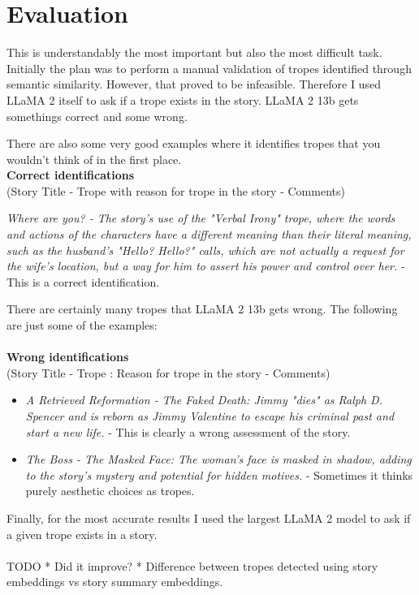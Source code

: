 \documentclass[11pt]{article}
\begin{document}
\section{Evaluation}
This is understandably the most important but also the most difficult task. Initially the plan was to perform a manual validation of tropes identified through semantic similarity. However, that proved to be infeasible. Therefore I used LLaMA 2 itself to ask if a trope exists in the story. LLaMA 2 13b gets somethings correct and some wrong.

There are also some very good examples where it identifies tropes that you wouldn't think of in the first place.\\
\textbf{Correct identifications}\\
(Story Title - Trope with reason for trope in the story - Comments)

\textit{Where are you? - The story's use of the "Verbal Irony" trope, where the words and actions of the characters have a different meaning than their literal meaning, such as the husband's "Hello? Hello?" calls, which are not actually a request for the wife's location, but a way for him to assert his power and control over her.} - This is a correct identification.

There are certainly many tropes that LLaMA 2 13b gets wrong. The following are just some of the examples:
\\
\\
\textbf{Wrong identifications}\\
(Story Title - Trope : Reason for trope in the story - Comments)\\
\begin{itemize}
  \item \textit{A Retrieved Reformation - The Faked Death: Jimmy "dies" as Ralph D. Spencer and is reborn as Jimmy Valentine to escape his criminal past and start a new life.} - This is clearly a wrong assessment of the story.
  \item \textit{The Boss - The Masked Face: The woman's face is masked in shadow, adding to the story's mystery and potential for hidden motives.} - Sometimes it thinks purely aesthetic choices as tropes.
\end{itemize}
Finally, for the most accurate results I used the largest LLaMA 2 model to ask if a given trope exists in a story.\\
\\
TODO
* Did it improve?
* Difference between tropes detected using story embeddings vs story summary embeddings.
\end{document}
